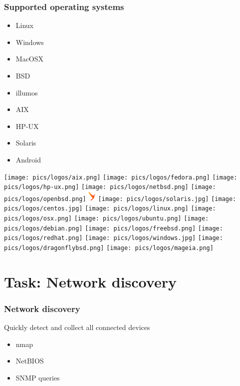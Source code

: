 \documentclass{beamer}
\begin{document}
\begin{frame}
    \frametitle{Supported operating systems}

    \begin{itemize}
        \item Linux
        \item Windows
        \item MacOSX
        \item BSD
        \item illumos
        \item AIX
        \item HP-UX
        \item Solaris
        \item Android
    \end{itemize}


\texttt{[image: pics/logos/aix.png]}
\texttt{[image: pics/logos/fedora.png]}
\texttt{[image: pics/logos/hp-ux.png]}
\texttt{[image: pics/logos/netbsd.png]}
\texttt{[image: pics/logos/openbsd.png]}
\includegraphics[height=0.5cm]{pics/logos/illumos.png}
\texttt{[image: pics/logos/solaris.jpg]}
\texttt{[image: pics/logos/centos.jpg]}
\texttt{[image: pics/logos/linux.png]}
\texttt{[image: pics/logos/osx.png]}
\texttt{[image: pics/logos/ubuntu.png]}
\texttt{[image: pics/logos/debian.png]}
\texttt{[image: pics/logos/freebsd.png]}
\texttt{[image: pics/logos/redhat.png]}
\texttt{[image: pics/logos/windows.jpg]}
\texttt{[image: pics/logos/dragonflybsd.png]}
\texttt{[image: pics/logos/mageia.png]}

\end{frame}

\section{Task: Network discovery}

\begin{frame}
    \frametitle{Network discovery}

    \begin{block}{Quickly detect and collect all connected devices}
    \begin{itemize}
      \item nmap
      \item NetBIOS
      \item SNMP queries
    \end{itemize}
    \end{block}

\end{frame}
\end{document}
